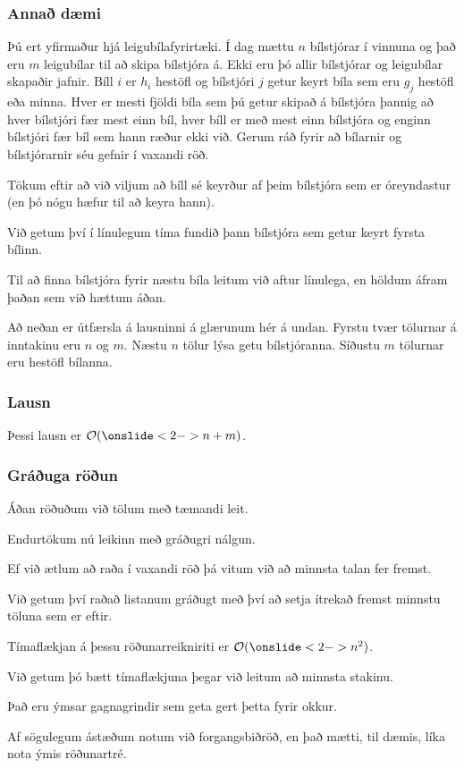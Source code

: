 {
	\frametitle{Annað dæmi}
	{
		\item<1-> 
			Þú ert yfirmaður hjá leigubílafyrirtæki.
			Í dag mættu $n$ bílstjórar í vinnuna og það eru $m$ leigubílar til að skipa bílstjóra á.
			Ekki eru þó allir bílstjórar og leigubílar skapaðir jafnir.
			Bíll $i$ er $h_i$ hestöfl og bílstjóri $j$ getur keyrt bíla sem eru $g_j$ hestöfl eða minna.
			Hver er mesti fjöldi bíla sem þú getur skipað á bílstjóra
				þannig að hver bílstjóri fær mest einn bíl,
				hver bíll er með mest einn bílstjóra og
				enginn bílstjóri fær bíl sem hann ræður ekki við.
			Gerum ráð fyrir að bílarnir og bílstjórarnir séu gefnir í vaxandi röð.
		\item<2-> Tökum eftir að við viljum að bíll sé keyrður af þeim bílstjóra sem er óreyndastur (en þó nógu hæfur til að keyra hann).
		\item<3-> Við getum því í línulegum tíma fundið þann bílstjóra sem getur keyrt fyrsta bílinn.
		\item<4-> Til að finna bílstjóra fyrir næstu bíla leitum við aftur línulega, en höldum áfram þaðan sem við hættum áðan.
	}
}

{
	{
		\item<1-> Að neðan er útfærsla á lausninni á glærunum hér á undan. Fyrstu tvær tölurnar á inntakinu eru $n$ og $m$. 
					Næstu $n$ tölur lýsa getu bílstjóranna.
					Síðustu $m$ tölurnar eru hestöfl bílanna.
		\item<2->[] 
	}
}

{
	\frametitle{Lausn}
	{
		\item<1-> Þessi lausn er $\mathcal{O}(\onslide<2->{n + m})$.
	}
}

{
	\frametitle{Gráðuga röðun}
	{
		\item<1-> Áðan röðuðum við tölum með tæmandi leit.
		\item<2-> Endurtökum nú leikinn með gráðugri nálgun.
		\item<3-> Ef við ætlum að raða í vaxandi röð þá vitum við að minnsta talan fer fremst.
		\item<4-> Við getum því raðað listanum gráðugt með því að setja ítrekað fremst minnstu töluna sem er eftir.
	}
}

{
}

{
	{
		\item<1-> Tímaflækjan á þessu röðunarreikniriti er $\mathcal{O}(\onslide<2->{n^2})$.
		\item<3-> Við getum þó bætt tímaflækjuna þegar við leitum að minnsta stakinu.
		\item<4-> Það eru ýmsar gagnagrindir sem geta gert þetta fyrir okkur.
		\item<5-> Af sögulegum ástæðum notum við forgangsbiðröð, en það mætti, til dæmis, líka nota ýmis röðunartré.
	}
}

